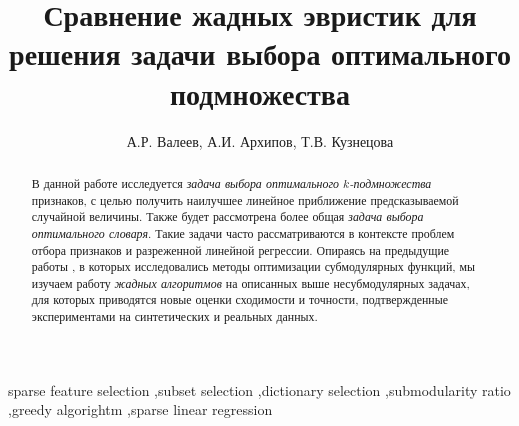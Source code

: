 \documentclass[preprint,12pt]{elsarticle}
\begin{document}
\begin{frontmatter}


\title{Сравнение жадных эвристик для решения задачи выбора оптимального подмножества}





\author{А.Р. Валеев, А.И. Архипов, Т.В. Кузнецова}

\address{Московский физико-технический институт, Долгопрудный}
\begin{abstract}
В данной работе исследуется \textit{задача выбора оптимального} \textit{$k$-подмножества} признаков, с целью получить наилучшее линейное приближение предсказываемой случайной величины. Также будет рассмотрена более общая \textit{задача выбора оптимального словаря}.
Такие задачи часто рассматриваются в контексте проблем отбора признаков и разреженной линейной регрессии. Опираясь на предыдущие работы \cite{nemhauser1978analysis, lovasz1983submodular}, в которых исследовались методы оптимизации субмодулярных функций, мы изучаем работу \textit{жадных алгоритмов} на описанных выше несубмодулярных задачах, для которых приводятся новые оценки сходимости и точности, подтвержденные экспериментами на синтетических и реальных данных. 

\end{abstract}

\begin{keyword}
sparse feature selection \sep subset selection \sep dictionary selection \sep submodularity ratio \sep greedy algorightm \sep sparse linear regression
\end{keyword}

\end{frontmatter}
\end{document}
